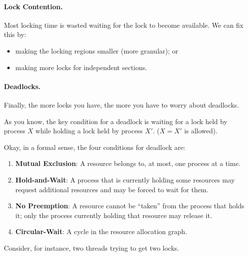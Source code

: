 \paragraph{Lock Contention.}
 Most locking time is wasted waiting for the lock to become available.
We can fix this by: \\ \vspace*{-3em}
      \begin{itemize}[noitemsep]
        \item making the locking regions smaller (more granular); or
        \item making more locks for independent sections.
      \end{itemize}

\paragraph{Deadlocks.} Finally, the more locks you have, the more you have to worry about deadlocks.

As you know, the key condition for a deadlock is waiting for a lock held by process $X$ while holding a lock held by process $X'$. ($X = X'$ is allowed).

Okay, in a formal sense, the four conditions for deadlock are: \\ \vspace*{-3em}

\begin{enumerate}
	\item \textbf{Mutual Exclusion}: A resource belongs to, at most, one process at a time.
	\item \textbf{Hold-and-Wait}: A process that is currently holding some resources may request additional resources and may be forced to wait for them.
	\item \textbf{No Preemption}: A resource cannot be ``taken'' from the process that holds it; only the process currently holding that resource may release it.
	\item \textbf{Circular-Wait}: A cycle in the resource allocation graph.
\end{enumerate}


Consider, for instance, two threads trying to get two locks.

